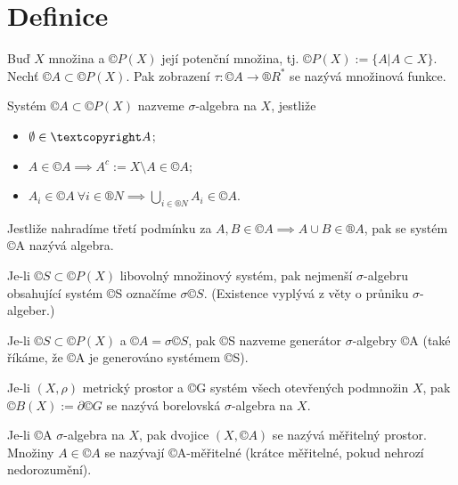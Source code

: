 \documentclass[12pt]{article}					%
\begin{document}

\part{Definice}
\begin{definice}
	Buď $X$ množina a $©P(X)$ její potenční množina, tj. $©P(X) := \{A | A \subset X\}$. Nechť $©A \subset ©P(X)$. Pak zobrazení $\tau: ©A \rightarrow ®R^*$ se nazývá množinová funkce.
\end{definice}

\begin{definice}
	Systém $©A \subset ©P(X)$ nazveme $\sigma$-algebra na $X$, jestliže

	\begin{itemize}
		\item $\O \in ©A$;
		\item $A \in ©A \implies A^c := X \setminus A \in ©A$;
		\item $A_i \in ©A\ \forall i \in ®N \implies \bigcup_{i \in ®N} A_i \in ©A$.
	\end{itemize}

	Jestliže nahradíme třetí podmínku za $A, B \in ©A \implies A \cup B \in ®A$, pak se systém ©A nazývá algebra.
\end{definice}

\begin{definice}[$\sigma ©S$]
	Je-li $©S \subset ©P(X)$ libovolný množinový systém, pak nejmenší $\sigma$-algebru obsahující systém ©S označíme $\sigma ©S$. (Existence vyplývá z věty o průniku $\sigma$-algeber.)
\end{definice}

\begin{definice}
	Je-li $©S \subset ©P(X)$ a $©A = \sigma ©S$, pak ©S nazveme generátor $\sigma$-algebry ©A (také říkáme, že ©A je generováno systémem ©S).
\end{definice}

\begin{definice}
	Je-li $(X, \rho)$ metrický prostor a ©G systém všech otevřených podmnožin $X$, pak $©B(X) := \partial ©G$ se nazývá borelovská $\sigma$-algebra na $X$.
\end{definice}

\begin{definice}
	Je-li ©A $\sigma$-algebra na $X$, pak dvojice $(X, ©A)$ se nazývá měřitelný prostor. Množiny $A \in ©A$ se nazývají ©A-měřitelné (krátce měřitelné, pokud nehrozí nedorozumění).
\end{definice}
\end{document}
